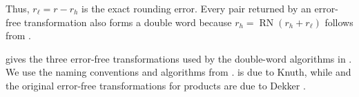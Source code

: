 
Thus, $r_\ell=r-r_h$ is the exact rounding error. Every pair returned by an
error-free transformation also forms a double word because
$r_h=\operatorname{RN}(r_h+r_\ell)$ follows from
.

 gives the three error-free
transformations used by the double-word algorithms in \FenceDD{}. 
We use the naming conventions and algorithms from 
\citet[Algorithms\ 1--3]{Joldes2017}.
\TwoSum{} is due to Knuth, while
\FastTwoSum{} and the original error-free transformations for products are due
to Dekker \citep{Knuth1997,Dekker1971}.

